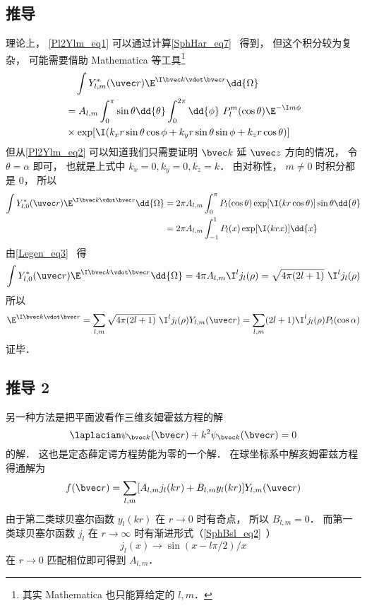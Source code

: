 \subsection{推导}
理论上， \autoref{Pl2Ylm_eq1} 可以通过计算\autoref{SphHar_eq7}~ 得到， 但这个积分较为复杂， 可能需要借助 Mathematica 等工具\footnote{其实 Mathematica 也只能算给定的 $l, m$．}
\begin{equation}
\begin{aligned}
&\quad \int Y_{l,m}^*(\uvec r)\E^{\I \bvec k \vdot \bvec r} \dd{\Omega}\\
&= A_{l,m}\int_0^\pi \sin\theta\dd{\theta} \int_0^{2\pi} \dd{\phi} \,\,P_l^m(\cos\theta) \E^{-\I m \phi}\\
&\times \exp[\I (k_x r \sin\theta\cos\phi + k_y r \sin\theta\sin\phi + k_z r \cos\theta)]
\end{aligned}
\end{equation}
但从\autoref{Pl2Ylm_eq2} 可以知道我们只需要证明 $\bvec k$ 延 $\uvec z$ 方向的情况， 令 $\theta = \alpha$ 即可， 也就是上式中 $k_x = 0, k_y = 0, k_z = k$． 由对称性， $m \ne 0$ 时积分都是 0， 所以
\begin{equation}
\begin{aligned}
\int Y_{l,0}^*(\uvec r)\E^{\I \bvec k \vdot \bvec r} \dd{\Omega}
&= 2\pi A_{l,m}\int_0^\pi P_l(\cos\theta) \exp[\I (k r \cos\theta)] \sin\theta\dd{\theta}\\
&= 2\pi A_{l,m}\int_{-1}^1 P_l(x) \exp[\I (k r x)] \dd{x}
\end{aligned}
\end{equation}
由\autoref{Legen_eq3}~ 得
\begin{equation}
\int Y_{l,0}^*(\uvec r)\E^{\I \bvec k \vdot \bvec r} \dd{\Omega}
= 4\pi A_{l,m} \I^l j_l(\rho)
= \sqrt{4\pi (2l + 1)}\ \I^l j_l(\rho)
\end{equation}
所以
\begin{equation}
\E^{\I \bvec k \vdot \bvec r} = \sum_{l,m} \sqrt{4\pi (2l + 1)}\ \I^l j_l(\rho) Y_{l,m}(\uvec r)
=\sum_{l,m} (2l + 1) \I^l j_l(\rho) P_l(\cos\alpha)
\end{equation}
证毕．

\subsection{推导 2}
另一种方法是把平面波看作三维亥姆霍兹方程的解
\begin{equation}
\laplacian \psi_{\bvec k}(\bvec r) + k^2 \psi_{\bvec k}(\bvec r) = 0
\end{equation}
的解． 这也是定态薛定谔方程势能为零的一个解． 在球坐标系中解亥姆霍兹方程 得通解为
\begin{equation}
f(\bvec r) = \sum_{l,m} [A_{l,m} j_l(kr) + B_{l,m} y_l(kr)] Y_{l,m}(\uvec r)
\end{equation}
由于第二类球贝塞尔函数 $y_l(kr)$ 在 $r\to 0$ 时有奇点， 所以 $B_{l,m} = 0$． 而第一类球贝塞尔函数 $j_l$ 在 $r\to \infty$ 时有渐进形式（\autoref{SphBsl_eq2}~）
\begin{equation}
j_l(x) \to \sin(x - l\pi /2)/x
\end{equation}
在 $r\to 0$ 匹配相位即可得到 $A_{l,m}$．
